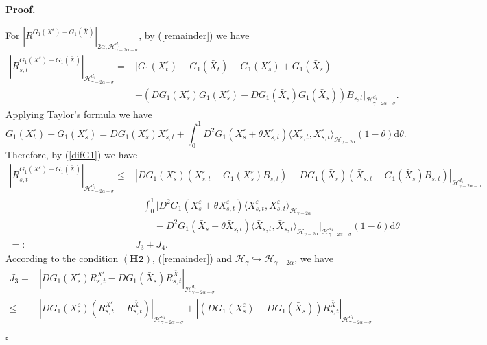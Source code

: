 \documentclass[10pt,a4paper]{article}
\numberwithin{equation}{section}
\newenvironment{proof}[1][\normalfont\bfseries Proof]{%
	\noindent #1.\hspace{0.5em}%
	\ignorespaces%
}{%
	\hfill $\square$%
	\par%
}
\begin{document}
\begin{proof}
	For $|R^{G_1(X^\varepsilon)-G_1(\bar{X})} |_{2\alpha, \mathcal H_{\gamma-2\alpha-\sigma}^{d_1 } }$, by (\ref{remainder}) we have	
	\begin{align*}
		\left|R^{G_1(X^\varepsilon)-G_1(\bar{X})}_{s,t} \right|_{\mathcal H_{\gamma-2\alpha-\sigma}^{d_1 }}
		=&\big|G_1(X_t^\varepsilon)-G_1(\bar{X}_t)-G_1(X_s^\varepsilon)+G_1(\bar{X}_s)  \nonumber\\ &-(DG_1(X_s^\varepsilon)G_1(X_s^\varepsilon)-DG_1(\bar{X}_s)G_1(\bar{X}_s)) B_{s,t} \big|_{\mathcal H_{\gamma-2\alpha-\sigma}^{d_1 }}.
	\end{align*}	
	Applying Taylor's formula we have
	\begin{equation}\label{difG1}
		G_1(X_t^\varepsilon)-G_1(X_s^\varepsilon)=DG_1(X_s^\varepsilon)X_{s,t}^\varepsilon+\int_0^1 D^2 G_1(X_s^\varepsilon+\theta X_{s,t}^\varepsilon) \langle X_{s,t}^\varepsilon, X_{s,t}^\varepsilon \rangle_{\mathcal H_{\gamma-2\alpha} }  (1-\theta) \mathrm{d} \theta.	
	\end{equation}
	Therefore, by (\ref{difG1}) we have
	\begin{align*}
		\left|R^{G_1(X^\varepsilon)-G_1(\bar{X})}_{s,t} \right|_{\mathcal H_{\gamma-2\alpha-\sigma}^{d_1 }}
		\leq & |DG_1(X_s^\varepsilon)(X_{s,t}^\varepsilon -G_1(X_s^\varepsilon) B_{s,t})-DG_1(\bar{X}_s)(\bar{X}_{s,t}-G_1(\bar{X}_s) B_{s,t}) |_{\mathcal H_{\gamma-2\alpha-\sigma}^{d_1 }}  \nonumber\\
		&+\int_0^1 |D^2 G_1(X_s^\varepsilon+\theta X_{s,t}^\varepsilon)  \langle X_{s,t}^\varepsilon, X_{s,t}^\varepsilon \rangle_{\mathcal H_{\gamma-2\alpha} }   \nonumber\\
		&~~~~~~~~~-D^2 G_1(\bar{X}_s+\theta \bar{X}_{s,t})  \langle \bar{X}_{s,t}, \bar{X}_{s,t} \rangle_{\mathcal H_{\gamma-2\alpha} }  |_{\mathcal H_{\gamma-2\alpha-\sigma}^{d_1 }} (1-\theta) \mathrm{d} \theta  \nonumber\\
		=: & J_3+J_4.
	\end{align*}
	According to the condition $(\mathbf{H2})$, (\ref{remainder}) and $\mathcal H_\gamma \hookrightarrow \mathcal H_{\gamma-2\alpha}$, we have
	\begin{align}\label{J3}
		J_3=&|DG_1(X_s^\varepsilon) R_{s,t}^{X^\varepsilon}-DG_1(\bar{X}_s) R_{s,t}^{\bar{X}} |_{\mathcal H_{\gamma-2\alpha-\sigma}^{d_1 }}  \nonumber\\
		\leq & |DG_1(X_s^\varepsilon) (R_{s,t}^{X^\varepsilon}-R_{s,t}^{\bar{X}}) |_{\mathcal H_{\gamma-2\alpha-\sigma}^{d_1 }}
		+| (DG_1(X_s^\varepsilon)-DG_1(\bar{X}_s)) R_{s,t}^{\bar{X}} |_{\mathcal H_{\gamma-2\alpha-\sigma}^{d_1 }} \nonumber\\

\end{align}
\end{proof}
\end{document}

